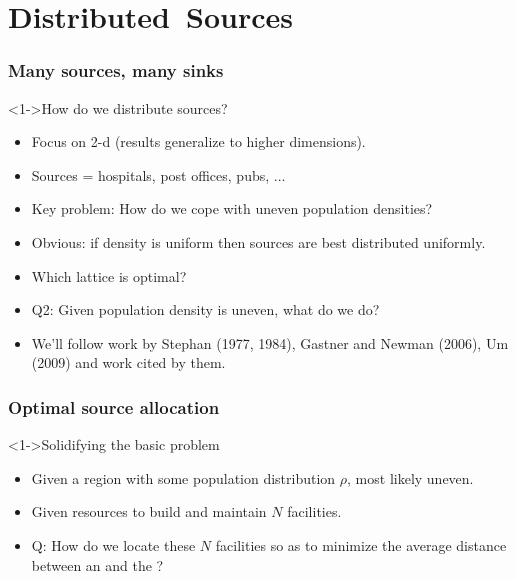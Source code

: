 
\section{Distributed\ Sources}


\begin{frame}
  \frametitle{Many sources, many sinks}
  
  \begin{block}<1->{How do we distribute sources?}
    \begin{itemize}
    \item<2-> Focus on 2-d (results generalize to higher dimensions).
    \item<3-> Sources = hospitals, post offices, pubs, ...
    \item<4-> \alert{Key problem:} How do we cope with uneven population densities?
    \item<5-> Obvious: if density is uniform then sources are best distributed
      \alert{uniformly}.
    \item<6-> Which lattice is optimal? 
    \item<8-> \alert{Q2:} Given population density is uneven, what do we do?
    \item<9-> We'll follow work by Stephan (1977, 1984)\cite{stephan1977a,stephan1984a},
      Gastner and Newman (2006)\cite{gastner2006c}, 
      Um \etal (2009)\cite{um2009a} and work cited by them.
    \end{itemize}
  \end{block}

\end{frame}


\begin{frame}
  \frametitle{Optimal source allocation}

  \begin{block}<1->{Solidifying the basic problem}
    \begin{itemize}
    \item<1-> Given a region with some population distribution $\rho$, most likely uneven.
    \item<2-> Given resources to build and maintain $N$ facilities.
    \item<3-> \alert{Q:} How do we locate these $N$ facilities so as to
      \alert{minimize the average distance} between an  and 
      the ?
    \end{itemize}
  \end{block}
\end{frame}

